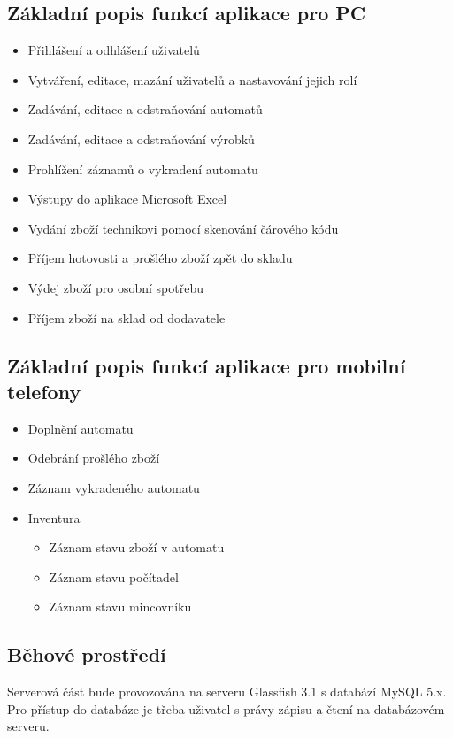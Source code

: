 \documentclass[a4paper,10pt]{article}
\begin{document}
\subsection{Základní popis funkcí aplikace pro PC}
\begin{itemize}
  \item Přihlášení a odhlášení uživatelů
  \item Vytváření, editace, mazání uživatelů a nastavování jejich rolí
  \item Zadávání, editace a odstraňování automatů
  \item Zadávání, editace a odstraňování výrobků
  \item Prohlížení záznamů o vykradení automatu
  \item Výstupy do aplikace Microsoft Excel
  \item Vydání zboží technikovi pomocí skenování čárového kódu
  \item Příjem hotovosti a prošlého zboží zpět do skladu
  \item Výdej zboží pro osobní spotřebu
  \item Příjem zboží na sklad od dodavatele
\end{itemize}

\subsection{Základní popis funkcí aplikace pro mobilní telefony}

\begin{itemize}
  \item Doplnění automatu
  \item Odebrání prošlého zboží
  \item Záznam vykradeného automatu
  \item Inventura
  \begin{itemize}
  	\item Záznam stavu zboží v automatu
  	\item Záznam stavu počítadel
  	\item Záznam stavu mincovníku
  \end{itemize}
\end{itemize}

\subsection{Běhové prostředí}
Serverová část bude provozována na serveru Glassfish 3.1 s databází MySQL 5.x. Pro přístup do databáze je třeba uživatel s právy zápisu a čtení na databázovém serveru.
\end{document}
